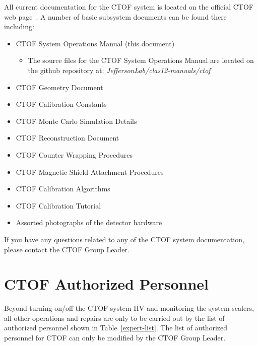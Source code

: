 \documentclass[12pt]{article}
\begin{document}
All current documentation for the CTOF system is located on the official CTOF web page~\cite{ctof-web}. A
number of basic subsystem documents can be found there including:

\begin{itemize}
\item CTOF System Operations Manual (this document)
 \begin{itemize}
  \item The source files for the CTOF System Operations Manual are located on the
         github repository at: {\it JeffersonLab/clas12-manuals/ctof}
 \end{itemize}
\item CTOF Geometry Document
\item CTOF Calibration Constants
\item CTOF Monte Carlo Simulation Details
\item CTOF Reconstruction Document
\item CTOF Counter Wrapping Procedures
\item CTOF Magnetic Shield Attachment Procedures
\item CTOF Calibration Algorithms
\item CTOF Calibration Tutorial
\item Assorted photographs of the detector hardware
\end{itemize}

If you have any questions related to any of the CTOF system documentation, please contact the CTOF Group
Leader.

\section{CTOF Authorized Personnel}
\label{personnel}

Beyond turning on/off the CTOF system HV and monitoring the system scalers, all other operations and repairs
are only to be carried out by the list of authorized personnel shown in Table~\ref{expert-list}. The list of
authorized personnel for CTOF can only be modified by the CTOF Group Leader.
\end{document}
